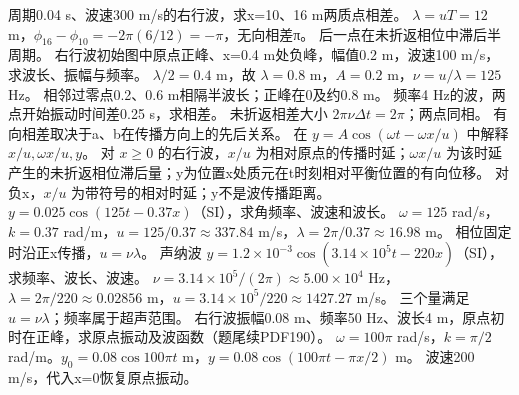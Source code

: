 \problemtext 周期0.04 s、波速300 m/s的右行波，求x=10、16 m两质点相差。
\workings $\lambda=uT=12$ m，$\phi_{16}-\phi_{10}=-2\pi(6/12)=-\pi$，无向相差π。
\crosscheck 后一点在未折返相位中滞后半周期。
\problemtext 右行波初始图中原点正峰、x=0.4 m处负峰，幅值0.2 m，波速100 m/s，求波长、振幅与频率。
\workings $\lambda/2=0.4$ m，故 $\lambda=0.8$ m，$A=0.2$ m，$\nu=u/\lambda=125$ Hz。
\crosscheck 相邻过零点0.2、0.6 m相隔半波长；正峰在0及约0.8 m。
\problemtext 频率4 Hz的波，两点开始振动时间差0.25 s，求相差。
\workings 未折返相差大小 $2\pi\nu\Delta t=2\pi$；两点同相。
\crosscheck 有向相差取决于a、b在传播方向上的先后关系。
\problemtext 在 $y=A\cos(\omega t-\omega x/u)$ 中解释 $x/u,\omega x/u,y$。
\workings 对 $x\ge0$ 的右行波，$x/u$ 为相对原点的传播时延；$\omega x/u$ 为该时延产生的未折返相位滞后量；y为位置x处质元在t时刻相对平衡位置的有向位移。
\crosscheck 对负x，$x/u$ 为带符号的相对时延；y不是波传播距离。
\problemtext $y=0.025\cos(125t-0.37x)$（SI），求角频率、波速和波长。
\workings $\omega=125$ rad/s，$k=0.37$ rad/m，$u=125/0.37\approx337.84$ m/s，$\lambda=2\pi/0.37\approx16.98$ m。
\crosscheck 相位固定时沿正x传播，$u=\nu\lambda$。
\problemtext 声纳波 $y=1.2\times10^{-3}\cos(3.14\times10^5t-220x)$（SI），求频率、波长、波速。
\workings $\nu=3.14\times10^5/(2\pi)\approx5.00\times10^4$ Hz，$\lambda=2\pi/220\approx0.02856$ m，$u=3.14\times10^5/220\approx1427.27$ m/s。
\crosscheck 三个量满足 $u=\nu\lambda$；频率属于超声范围。
\problemtext 右行波振幅0.08 m、频率50 Hz、波长4 m，原点初时在正峰，求原点振动及波函数（题尾续PDF190）。
\workings $\omega=100\pi$ rad/s，$k=\pi/2$ rad/m。$y_0=0.08\cos100\pi t$ m，$y=0.08\cos(100\pi t-\pi x/2)$ m。
\crosscheck 波速200 m/s，代入x=0恢复原点振动。

